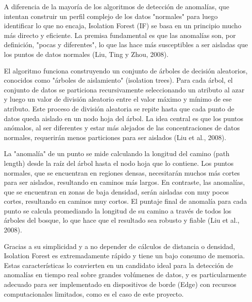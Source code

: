 
A diferencia de la mayoría de los algoritmos de detección de anomalías, que intentan construir un perfil complejo de los datos "normales" para luego identificar lo que no encaja, Isolation Forest (IF) se basa en un principio mucho más directo y eficiente. La premisa fundamental es que las anomalías son, por definición, "pocas y diferentes", lo que las hace más susceptibles a ser aisladas que los puntos de datos normales (Liu, Ting y Zhou, 2008).

El algoritmo funciona construyendo un conjunto de árboles de decisión aleatorios, conocidos como "árboles de aislamiento" (isolation trees). Para cada árbol, el conjunto de datos se particiona recursivamente seleccionando un atributo al azar y luego un valor de división aleatorio entre el valor máximo y mínimo de ese atributo. Este proceso de división aleatoria se repite hasta que cada punto de datos queda aislado en un nodo hoja del árbol. La idea central es que los puntos anómalos, al ser diferentes y estar más alejados de las concentraciones de datos normales, requerirán menos particiones para ser aislados (Liu et al., 2008).

La "anomalía" de un punto se mide calculando la longitud del camino (path length) desde la raíz del árbol hasta el nodo hoja que lo contiene. Los puntos normales, que se encuentran en regiones densas, necesitarán muchos más cortes para ser aislados, resultando en caminos más largos. En contraste, las anomalías, que se encuentran en zonas de baja densidad, serán aisladas con muy pocos cortes, resultando en caminos muy cortos. El puntaje final de anomalía para cada punto se calcula promediando la longitud de su camino a través de todos los árboles del bosque, lo que hace que el resultado sea robusto y fiable (Liu et al., 2008).

Gracias a su simplicidad y a no depender de cálculos de distancia o densidad, Isolation Forest es extremadamente rápido y tiene un bajo consumo de memoria. Estas características lo convierten en un candidato ideal para la detección de anomalías en tiempo real sobre grandes volúmenes de datos, y es particularmente adecuado para ser implementado en dispositivos de borde (Edge) con recursos computacionales limitados, como es el caso de este proyecto.



